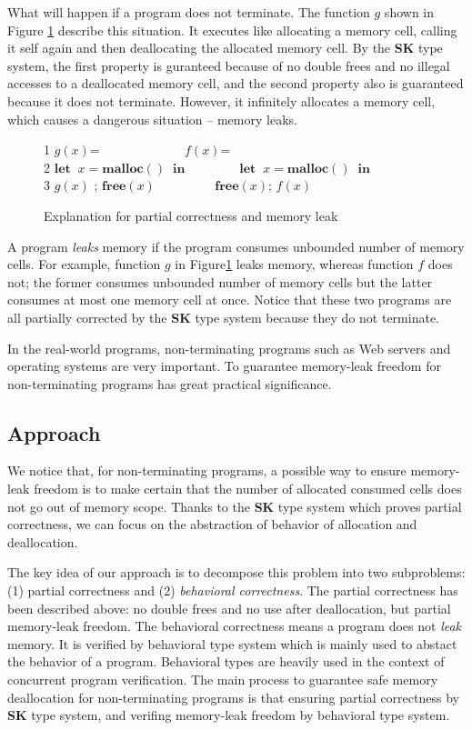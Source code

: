 \documentclass[english]{jssst_ppl} %
\newcommand\LET{\mathbf{let}\;}
\newcommand\IN{\mathbf{in}\;}
\newcommand\Rtab{\; \; \; \;}
\newcommand\MALLOC{\mathbf{malloc()}\;}
\newcommand\Free{\mathbf{free}}
\newcommand\Cirx{(x)}
\newcommand\dtb{\;\;\ \;\;\ \;\;\ \;\;\  }
\begin{document}
What will happen if a program does not terminate. The function $g$ shown in Figure \ref{example:pam} describe this situation. It executes like allocating a memory cell, calling it self again and then deallocating the allocated memory cell. By the \textbf{SK} type system, the first property is guranteed because of no double frees and no illegal accesses to a deallocated memory cell, and the second property also is guaranteed because it does not terminate. However, it infinitely allocates a memory cell, which causes a dangerous situation -- memory leaks.
\begin{figure}[h]
1 \;\; $g(x)$= \dtb\dtb\dtb\Rtab\;\;$f(x)$=  \\
2 \;\; $\LET \; x = \MALLOC  \; \IN$\dtb\dtb$\LET \; x = \MALLOC  \; \IN$\\
3 \;\; $g(x)$ ; \; $\Free\Cirx$ \dtb\dtb\Rtab\;\;$\Free\Cirx$; \; $f(x)$
\caption{Explanation for partial correctness and memory leak}
\label{example:pam}
\end{figure}

A program \emph{leaks} memory if the program consumes unbounded number of memory cells. For example, function $g$ in Figure\ref{example:pam} leaks memory, whereas function $f$ does not; the former consumes unbounded number of memory cells but the latter consumes at most one memory cell at once. Notice that these two programs are all partially corrected by the \textbf{SK} type system because they do not terminate.

In the real-world programs, non-terminating programs such as Web servers and operating systems are very important. To guarantee memory-leak freedom for non-terminating programs has great practical significance.
\subsection{Approach}
We notice that, for non-terminating programs, a possible way to ensure memory-leak freedom is to make certain that the number of allocated consumed cells does not go out of memory scope. Thanks to the \textbf{SK} type system which proves partial correctness, we can focus on the abstraction of behavior of allocation and deallocation.

The key idea of our approach is to decompose this problem into two subproblems: (1) partial correctness and (2) \emph{behavioral correctness}. The partial correctness has been described above: no double frees and no use after deallocation, but partial memory-leak freedom. The behavioral correctness means a program does not \emph{leak} memory. It is verified by behavioral type system which is mainly used to abstact the behavior of a program. Behavioral types are heavily used in the context of concurrent program verification\cite{DBLP:journals/lmcs/KobayashiSW06,DBLP:journals/tcs/IgarashiK04,DBLP:conf/esop/HondaVK98}. The main process to guarantee safe memory deallocation for non-terminating programs is that ensuring partial correctness by \textbf{SK} type system, and verifing memory-leak freedom by behavioral type system. 
\end{document}

